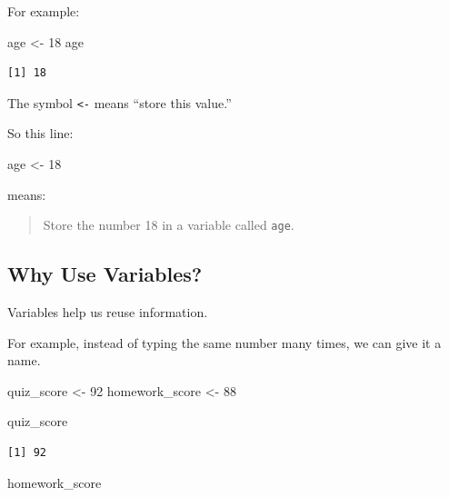 \documentclass[
  letterpaper,
  DIV=11,
  numbers=noendperiod]{scrartcl}
\newenvironment{Shaded}{\begin{snugshade}}{\end{snugshade}}
\newcommand{\DecValTok}[1]{\textcolor[rgb]{0.68,0.00,0.00}{#1}}
\newcommand{\NormalTok}[1]{\textcolor[rgb]{0.00,0.23,0.31}{#1}}
\newcommand{\OtherTok}[1]{\textcolor[rgb]{0.00,0.23,0.31}{#1}}
\begin{document}
For example:

\begin{Shaded}
\begin{Highlighting}[]
\NormalTok{age }\OtherTok{\textless{}{-}} \DecValTok{18}
\NormalTok{age}
\end{Highlighting}
\end{Shaded}

\begin{verbatim}
[1] 18
\end{verbatim}

The symbol \texttt{\textless{}-} means ``store this value.''

So this line:

\begin{Shaded}
\begin{Highlighting}[]
\NormalTok{age }\OtherTok{\textless{}{-}} \DecValTok{18}
\end{Highlighting}
\end{Shaded}

means:

\begin{quote}
Store the number 18 in a variable called \texttt{age}.
\end{quote}

\subsection{Why Use Variables?}\label{why-use-variables}

Variables help us reuse information.

For example, instead of typing the same number many times, we can give
it a name.

\begin{Shaded}
\begin{Highlighting}[]
\NormalTok{quiz\_score }\OtherTok{\textless{}{-}} \DecValTok{92}
\NormalTok{homework\_score }\OtherTok{\textless{}{-}} \DecValTok{88}

\NormalTok{quiz\_score}
\end{Highlighting}
\end{Shaded}

\begin{verbatim}
[1] 92
\end{verbatim}

\begin{Shaded}
\begin{Highlighting}[]
\NormalTok{homework\_score}
\end{Highlighting}
\end{Shaded}
\end{document}
